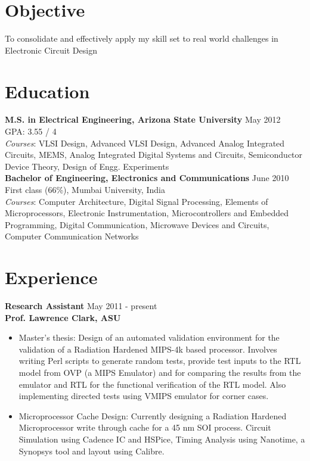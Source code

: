 \documentclass[margin]{res}
\begin{document}
\vspace*{-0.5in}


\address{ \textit{email}: ssridh14@asu.edu\\ \textit{phone}:  +1 (480) 327-7224}

\begin{resume} 

\section{Objective}
To consolidate and effectively apply my skill set to real world challenges in Electronic Circuit Design

\section{Education}
{\bf M.S. in Electrical Engineering, Arizona State University} \hfill  May 2012\\
GPA: 3.55 / 4\\
\textit{Courses}: VLSI Design, Advanced VLSI Design, Advanced Analog Integrated Circuits, MEMS, Analog Integrated Digital Systems and Circuits, Semiconductor Device Theory, Design of Engg. Experiments\\

\vspace{-0.2in}
{\bf Bachelor of Engineering, Electronics and Communications}  \hfill June 2010\\
First class (66\%), Mumbai University, India\\
\textit{Courses}: Computer Architecture, Digital Signal Processing, Elements of Microprocessors, Electronic Instrumentation, Microcontrollers and Embedded Programming, Digital Communication, Microwave Devices and Circuits, Computer Communication Networks

\section{Experience}
{\bf Research Assistant} \hfill May 2011 - present\\
{\bf Prof. Lawrence Clark, ASU}
\begin{itemize}
	\item Master’s thesis: Design of an automated validation environment for the validation of a Radiation Hardened MIPS-4k based processor. Involves writing Perl scripts to generate random tests, provide test inputs to the RTL model from OVP (a MIPS Emulator) and for comparing the results from the emulator and RTL for the functional verification of the RTL model. Also implementing directed tests using VMIPS emulator for corner cases.	
	\item Microprocessor Cache Design: Currently designing a Radiation Hardened Microprocessor write through cache for a 45 nm SOI process. Circuit Simulation using Cadence IC and HSPice, Timing Analysis using Nanotime, a Synopsys tool and layout using Calibre.
\end{itemize} 


\end{resume}
\end{document}
